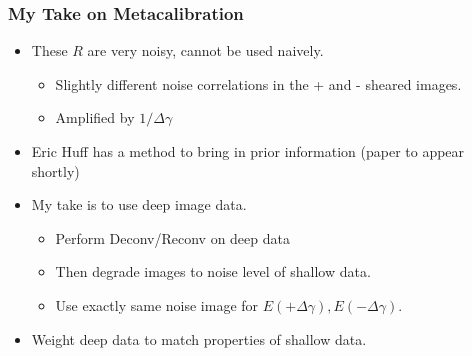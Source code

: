 \documentclass{beamer}
\begin{document}
\frame
{
    \frametitle{My Take on Metacalibration}

 
    \begin{itemize}

        \item These {\color{gold} $R$} are very noisy, cannot be used naively.
            \begin{itemize}

                \item Slightly different noise correlations in the + and -
                    sheared images.
                \item Amplified by {\color{gold} $1/\Delta \gamma$}
            \end{itemize}

        \item Eric Huff has a method to bring in prior information (paper
            to appear shortly)

        \item My take is to use deep image data.
            \begin{itemize}
                \item Perform Deconv/Reconv on deep data
                \item Then degrade images to noise level of shallow data.
                \item Use exactly same noise image for 
                    {\color{gold} $E(+\Delta\gamma), E(-\Delta\gamma)$}.
            \end{itemize}

        \item Weight deep data to match properties of shallow data.

    \end{itemize}

}
\end{document}

